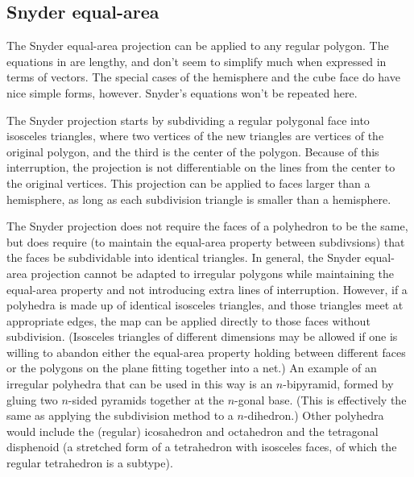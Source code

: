 \documentclass{amsart}[12pt]
\begin{document}
\subsection{Snyder equal-area}
The Snyder equal-area projection can be applied to any regular polygon. The
equations in \cite{snyder92} are lengthy, and don't seem to simplify much when
expressed in terms of vectors. The special cases of the hemisphere and the cube
face do have nice simple forms, however.\cite{lambers}\cite{patt} Snyder's
equations won't be repeated here.

The Snyder projection starts by subdividing a regular polygonal face into
isosceles triangles, where two vertices of the new triangles are vertices of
the original polygon, and the third is the center of the polygon. Because of
this interruption, the projection is not differentiable on the lines from the
center to the original vertices. This projection can be applied to faces larger
than a hemisphere, as long as each subdivision triangle is smaller than a
hemisphere.

The Snyder projection does not require the faces of a polyhedron to be the
same, but does require (to maintain the equal-area property between
subdivsions) that the faces be subdividable into identical triangles. In
general, the Snyder equal-area projection cannot be adapted to irregular
polygons while maintaining the equal-area property and not introducing extra
lines of interruption. However, if a polyhedra is made up of identical
isosceles triangles, and those triangles meet at appropriate edges, the map can
be applied directly to those faces without subdivision. (Isosceles triangles of
different dimensions may be allowed if one is willing to abandon either the
equal-area property holding between different faces or the polygons on the
plane fitting together into a net.) An example of an irregular polyhedra that
can be used in this way is an $n$-bipyramid, formed by gluing two $n$-sided
pyramids together at the $n$-gonal base. (This is effectively the same as
applying the subdivision method to a $n$-dihedron.) Other polyhedra would
include the (regular) icosahedron and octahedron and the tetragonal disphenoid
(a stretched form of a tetrahedron with isosceles faces, of which the regular
tetrahedron is a subtype).
\end{document}
